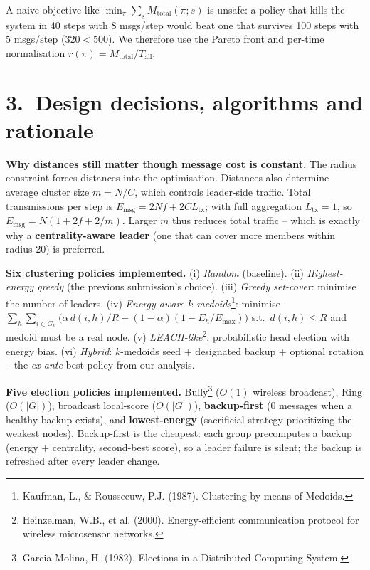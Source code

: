 \documentclass[a4paper,10pt]{article}
\begin{document}
A naive objective like $\min_\pi \sum_s M_{\text{total}}(\pi;s)$ is unsafe:
a policy that kills the system in 40 steps with $8$ msgs/step would beat one
that survives 100 steps with $5$ msgs/step ($320<500$).  We therefore use
the Pareto front and per-time normalisation $\bar r(\pi)=M_{\text{total}}/T_{\text{all}}$.

\vspace{-0.6em}
\section*{3.\ Design decisions, algorithms and rationale}
\vspace{-0.4em}
\textbf{Why distances still matter though message cost is constant.}
The radius constraint forces distances into the optimisation.  Distances
also determine average cluster size $m=N/C$, which controls leader-side
traffic.  Total transmissions per step is
$E_{\text{msg}}=2Nf+2CL_{\text{tx}}$; with full aggregation $L_{\text{tx}}=1$,
so $E_{\text{msg}}=N(1+2f+2/m)$.  Larger $m$ thus reduces total traffic
-- which is exactly why a \textbf{centrality-aware leader} (one that can
cover more members within radius 20) is preferred.

\textbf{Six clustering policies implemented.}  (i) \emph{Random} (baseline).
(ii) \emph{Highest-energy greedy} (the previous submission's choice).
(iii) \emph{Greedy set-cover}: minimise the number of leaders.
(iv) \emph{Energy-aware $k$-medoids}\footnote{Kaufman, L., \& Rousseeuw, P.J. (1987). Clustering by means of Medoids.}: minimise
$\sum_h\sum_{i\in G_h}\bigl(\alpha\,d(i,h)/R+(1{-}\alpha)(1{-}E_h/E_{\max})\bigr)$
s.t.\ $d(i,h)\le R$ and medoid must be a real node.
(v) \emph{LEACH-like}\footnote{Heinzelman, W.B., et al. (2000). Energy-efficient communication protocol for wireless microsensor networks.}: probabilistic head election with energy bias.
(vi) \emph{Hybrid}: $k$-medoids seed + designated backup + optional
rotation -- the \emph{ex-ante} best policy from our analysis.

\textbf{Five election policies implemented.}  Bully\footnote{Garcia-Molina, H. (1982). Elections in a Distributed Computing System.} ($O(1)$ wireless broadcast),
Ring ($O(|G|)$), broadcast local-score ($O(|G|)$),
\textbf{backup-first} (0 messages when a healthy backup exists), and \textbf{lowest-energy} (sacrificial strategy prioritizing the weakest nodes).
Backup-first is the cheapest: each group precomputes a backup
(energy + centrality, second-best score), so a leader failure is silent;
the backup is refreshed after every leader change.
\end{document}
